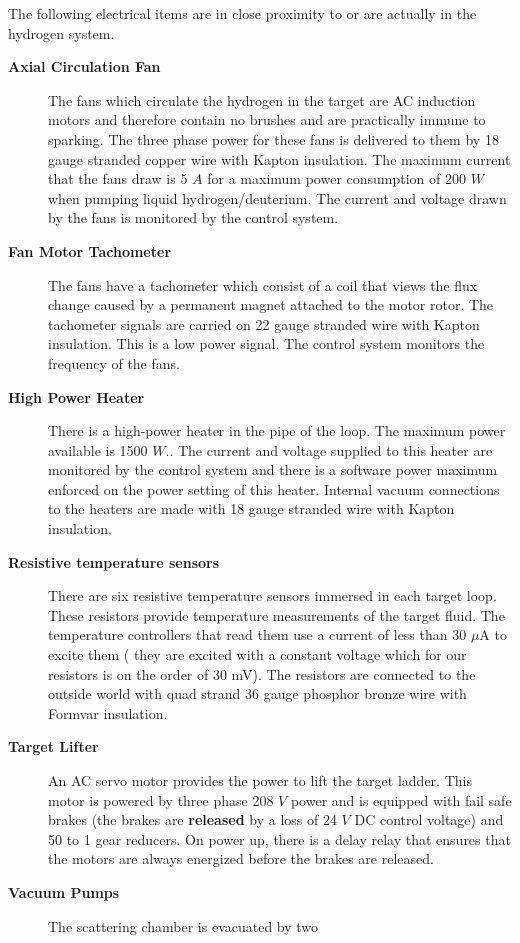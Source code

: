 \begin{safetyen}{10}{5}
{The following electrical items are in close proximity to or are actually
in the hydrogen system.
\begin{description}
\item [{\bf Axial Circulation Fan}] The fans which circulate the hydrogen
in the target are AC induction motors and therefore contain no brushes
and are practically immune to sparking. The three phase power for
these fans is delivered to them by 18 gauge stranded copper wire with
Kapton insulation. The maximum current that the fans draw is 5 $A$
for a maximum power consumption of 200 $W$ when pumping liquid hydrogen/deuterium.
The current and voltage drawn by the fans is monitored by the control
system. 
\item [{\bf Fan Motor Tachometer}] The fans have a tachometer which consist
of a coil that views the flux change caused by a permanent magnet
attached to the motor rotor. The tachometer signals are carried on
22 gauge stranded wire with Kapton insulation. This is a low power
signal. The control system monitors the frequency of the fans. 
\item [{\bf High Power Heater}] There is a high-power heater in the pipe
of the loop. The maximum power available is 1500 $W$.. The current
and voltage supplied to this heater are monitored by the control system
and there is a software power maximum enforced on the power setting
of this heater. Internal vacuum connections to the heaters are made
with 18 gauge stranded wire with Kapton insulation. 
\item [{\bf Resistive temperature sensors}] There are six resistive temperature
sensors immersed in each target loop. These resistors provide temperature
measurements of the target fluid. The temperature controllers that
read them use a current of less than 30 $\mu$A to excite them ( they
are excited with a constant voltage which for our resistors is on
the order of 30 mV). The resistors are connected to the outside world
with quad strand 36 gauge phosphor bronze wire with Formvar insulation. 
\item [{\bf Target Lifter}] An AC servo motor provides the power to lift
the target ladder. This motor is powered by three phase 208 $V$ power
and is equipped with fail safe brakes (the brakes are \textbf{released}
by a loss of 24 $V$ DC control voltage) and 50 to 1 gear reducers.
On power up, there is a delay relay that ensures that the motors are
always energized before the brakes are released. 
\item [{\bf Vacuum Pumps}] The scattering chamber is evacuated by two

\end{description}}
\end{safetyen}

